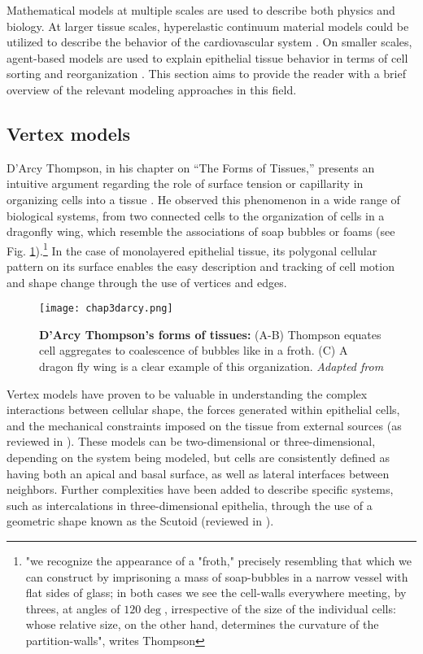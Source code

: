 Mathematical models at multiple scales are used to describe both physics and biology. At larger tissue scales, hyperelastic continuum material models could be utilized to describe the behavior of the cardiovascular system \cite{holzapfel2019}. On smaller scales, agent-based models are used to explain epithelial tissue behavior in terms of cell sorting and reorganization \cite{voss-bohme2012}. This section aims to provide the reader with a brief overview of the relevant modeling approaches in this field.

\hypertarget{vertex-models}{%
	\subsection{Vertex models}\label{vertex-models}}

D'Arcy Thompson, in his chapter on ``The Forms of Tissues,'' presents an intuitive argument regarding the role of surface tension or capillarity in organizing cells into a tissue \cite{thompson1979, graner2017}. He observed this phenomenon in a wide range of biological systems, from two connected cells to the organization of cells in a dragonfly wing, which resemble the
associations of soap bubbles or foams (see Fig. \ref{fig_3_6}).\footnote{"we recognize the appearance of a "froth," precisely resembling that which we can construct by imprisoning a mass of soap-bubbles in a narrow vessel with flat sides of glass; in both cases we see the cell-walls everywhere meeting, by threes, at angles of $120 \deg$, irrespective of the size of the individual cells: whose relative size, on the other hand, determines the curvature of the partition-walls", writes Thompson}
In the case of monolayered epithelial tissue, its polygonal cellular pattern on its surface enables the easy description and tracking of cell motion and shape change through the use of vertices and edges.

\begin{figure}
	\centering
	\texttt{[image: chap3darcy.png]}
	\caption{\label{fig_3_6} \textbf{D'Arcy Thompson's forms of tissues:} (A-B) Thompson equates cell aggregates to coalescence of bubbles like in a froth. (C) A dragon fly wing is a clear example of this organization. \textit{Adapted from \cite{thompson1979}}
	}
\end{figure}

Vertex models have proven to be valuable in understanding the complex interactions between cellular shape, the forces generated within epithelial cells, and the mechanical constraints imposed on the tissue from external sources (as reviewed in \cite{alt2017}). These models can be two-dimensional or three-dimensional, depending on the system being modeled, but cells are consistently defined as having both an apical and basal surface, as well as lateral interfaces between neighbors. Further complexities have been added to describe specific systems, such as intercalations in three-dimensional epithelia, through the use of a geometric shape known as the Scutoid (reviewed in \cite{gomez-galvez2021}).

